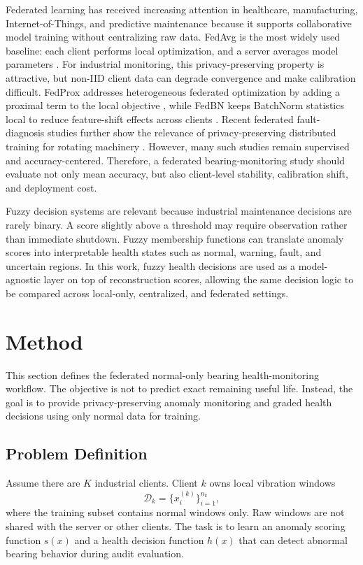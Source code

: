 \documentclass[11pt]{article}
\begin{document}
Federated learning has received increasing attention in healthcare, manufacturing, Internet-of-Things, and predictive maintenance because it supports collaborative model training without centralizing raw data. FedAvg is the most widely used baseline: each client performs local optimization, and a server averages model parameters \citep{mcmahan2017fedavg}. For industrial monitoring, this privacy-preserving property is attractive, but non-IID client data can degrade convergence and make calibration difficult. FedProx addresses heterogeneous federated optimization by adding a proximal term to the local objective \citep{li2020fedprox}, while FedBN keeps BatchNorm statistics local to reduce feature-shift effects across clients \citep{li2021fedbn}. Recent federated fault-diagnosis studies further show the relevance of privacy-preserving distributed training for rotating machinery \citep{li2021modularflfault,survishno2023flbearing}. However, many such studies remain supervised and accuracy-centered. Therefore, a federated bearing-monitoring study should evaluate not only mean accuracy, but also client-level stability, calibration shift, and deployment cost.

Fuzzy decision systems are relevant because industrial maintenance decisions are rarely binary. A score slightly above a threshold may require observation rather than immediate shutdown. Fuzzy membership functions can translate anomaly scores into interpretable health states such as normal, warning, fault, and uncertain regions. In this work, fuzzy health decisions are used as a model-agnostic layer on top of reconstruction scores, allowing the same decision logic to be compared across local-only, centralized, and federated settings.

\section{Method}

This section defines the federated normal-only bearing health-monitoring workflow. The objective is not to predict exact remaining useful life. Instead, the goal is to provide privacy-preserving anomaly monitoring and graded health decisions using only normal data for training.

\subsection{Problem Definition}

Assume there are $K$ industrial clients. Client $k$ owns local vibration windows
\[
\mathcal{D}_k = \{x_i^{(k)}\}_{i=1}^{n_k},
\]
where the training subset contains normal windows only. Raw windows are not shared with the server or other clients. The task is to learn an anomaly scoring function $s(x)$ and a health decision function $h(x)$ that can detect abnormal bearing behavior during audit evaluation.
\end{document}
